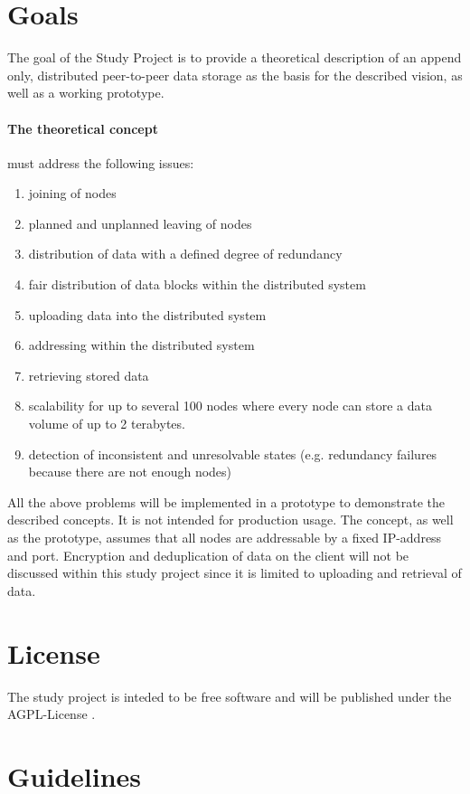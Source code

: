 \documentclass[a4paper]{article}
\begin{document}
\section{Goals}

The goal of the Study Project is to provide a theoretical description of an append only, distributed peer-to-peer data storage as the basis for the described vision, as well as a working prototype.

\paragraph{The theoretical concept} must address the following issues:

\begin{enumerate}[label=\alph*.]
\item joining of nodes
\item planned and unplanned leaving of nodes
\item distribution of data with a defined degree of redundancy
\item fair distribution of data blocks within the distributed system
\item uploading data into the distributed system
\item addressing within the distributed system
\item retrieving stored data
\item scalability for up to several 100 nodes where every node can store a data volume of up to 2 terabytes.
\item detection of inconsistent and unresolvable states (e.g. redundancy failures because there are not enough nodes)	
\end{enumerate}

All the above problems will be implemented in a prototype to demonstrate the described concepts. It is not intended for production usage.
The concept, as well as the prototype, assumes that all nodes are addressable by a fixed IP-address and port.
Encryption and deduplication of data on the client will not be discussed within this study project since it is limited to uploading and retrieval of data.

\section{License}
The study project is inteded to be free software and will be published under the AGPL-License \cite{agplv3}.

\section{Guidelines}
\end{document}
